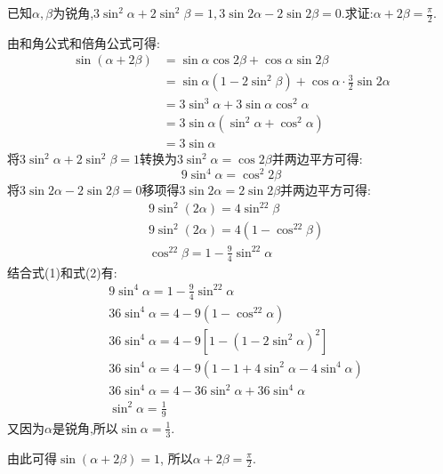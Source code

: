 \begin{questions}
	\question[20] 已知$\alpha,\beta$为锐角,$3\sin^2\alpha + 2\sin^2\beta=1, 3\sin2\alpha - 2\sin2\beta
		=0$.求证:$\alpha+2\beta=\frac{\pi}2.$

	\begin{proofsolution}
		由和角公式和倍角公式可得:
		\begin{align*}
			\sin(\alpha + 2\beta) & = \sin\alpha\cos2\beta + \cos\alpha\sin2\beta                      \\
			                      & = \sin\alpha(1 - 2\sin^2\beta) + \cos\alpha\cdot\frac32\sin2\alpha \\
			                      & = 3\sin^3\alpha  + 3\sin\alpha\cos^2\alpha                         \\
			                      & = 3\sin\alpha(\sin^2\alpha + \cos^2\alpha)                         \\
			                      & = 3\sin\alpha
		\end{align*}
		将$3\sin^2\alpha + 2\sin^2\beta=1$转换为$3\sin^2\alpha=\cos2\beta$并两边平方可得:
		\begin{equation*}
			9\sin^4\alpha = \cos^2{2\beta} \tag{1}
		\end{equation*}
		将$3\sin2\alpha-2\sin2\beta=0$移项得$3\sin2\alpha=2\sin2\beta$并两边平方可得:
		\begin{align*}
			 & 9\sin^2(2\alpha)  = 4\sin^22\beta               \\
			 & 9\sin^2(2\alpha)  = 4(1-\cos^22\beta)           \\
			 & \cos^22\beta = 1 - \frac94\sin^22\alpha \tag{2}
		\end{align*}
		结合式(1)和式(2)有:
		\begin{align*}
			 & 9\sin^4\alpha = 1 - \frac94\sin^22\alpha                 \\
			 & 36\sin^4\alpha = 4 - 9(1-\cos^22\alpha)                  \\
			 & 36\sin^4\alpha = 4 - 9[1-(1-2\sin^2\alpha)^2]            \\
			 & 36\sin^4\alpha = 4 - 9(1-1+4\sin^2\alpha -4\sin^4\alpha) \\
			 & 36\sin^4\alpha = 4 - 36\sin^2\alpha + 36\sin^4\alpha     \\
			 & \sin^2\alpha = \frac19
		\end{align*}
		又因为$\alpha$是锐角,所以$\sin\alpha=\frac13$.

		由此可得$\sin(\alpha+2\beta) = 1$, 所以$\alpha+2\beta=\frac{\pi}{2}$.
	\end{proofsolution}

\end{questions}
